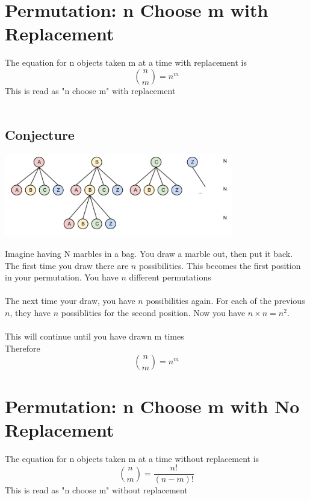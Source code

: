 \section{ Permutation: n Choose m with Replacement}
The equation for n objects taken m at a time with replacement is
\[{n\choose m} = n^m\]
This is read as "n choose m" with replacement\\
\\
\subsection{Conjecture}
\begin{center}
\includegraphics[width=10cm]{Combinatorics/permutations_diag1}
\end{center}
Imagine having N marbles in a bag.  You draw a marble out, then put it back.  The first time you draw there are \(n\) possibilities.  This becomes the first position in your permutation. You have \(n\) different permutations\\
\\
The next time your draw, you have \(n\) possibilities again.  For each of the previous \(n\), they have \(n\) possiblities for the second position.  Now you have \(n\times n = n^2\). \\
\\
This will continue until you have drawn m times
\\
Therefore
\[{n\choose m} = n^m\]


\section{ Permutation: n Choose m with No Replacement}
The equation for n objects taken m at a time without replacement is
\[{n\choose m} = \frac{n!}{(n-m)!}\]
This is read as "n choose m" without replacement\\
\\
